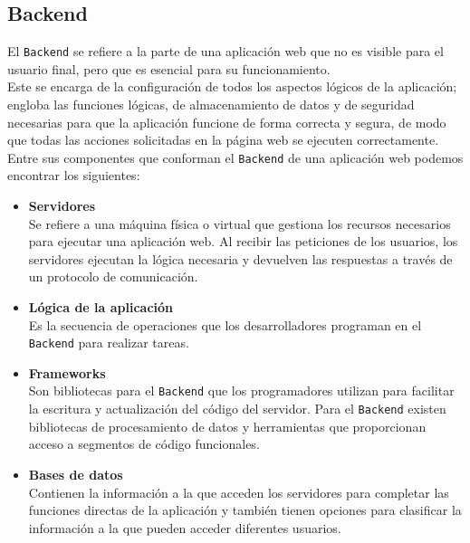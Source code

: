 \subsection{Backend}

El \texttt{Backend} se refiere a la parte de una aplicación web que no es visible para el usuario final, pero que es esencial para su funcionamiento. \\

Este se encarga de la configuración de todos los aspectos lógicos de la aplicación; engloba las funciones lógicas, de almacenamiento de datos y de seguridad necesarias para que la aplicación funcione de forma correcta y segura, de modo que todas las acciones solicitadas en la página web se ejecuten correctamente.
\\

Entre sus componentes que conforman el \texttt{Backend} de una aplicación web podemos encontrar los siguientes:

\begin{itemize}
    \item \textbf{Servidores}\\
     Se refiere a una máquina física o virtual que gestiona los recursos necesarios para ejecutar una aplicación web. Al recibir las peticiones de los usuarios, los servidores ejecutan la lógica necesaria y devuelven las respuestas a través de un protocolo de comunicación.

     \item \textbf{Lógica de la aplicación}\\
     Es la secuencia de operaciones que los desarrolladores programan en el \texttt{Backend} para realizar tareas.

     \item \textbf{Frameworks}\\
     Son bibliotecas para el \texttt{Backend} que los programadores utilizan para facilitar la escritura y actualización del código del servidor. Para el \texttt{Backend} existen bibliotecas de procesamiento de datos y herramientas que proporcionan acceso a segmentos de código funcionales.

    \item \textbf{Bases de datos}\\
    Contienen la información a la que acceden los servidores para completar las funciones directas de la aplicación y también tienen opciones para clasificar la información a la que pueden acceder diferentes usuarios.
\end{itemize}

